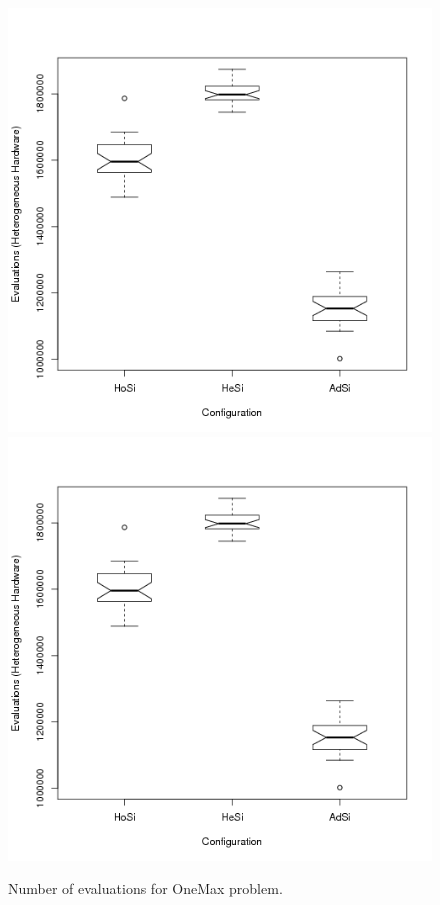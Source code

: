 \begin{figure}
\centering

   \includegraphics[scale =0.4] {gfx/adaptiveresults/evalsONEMAXhetero.png}
   \label{fig:subfig1}
   \includegraphics[scale =0.4] {gfx/adaptiveresults/evalsONEMAXhetero.png}
   \label{fig:subfig2}
\caption{Number of evaluations for OneMax problem.}
\label{fig:evalsOneMax}
\end{figure}



